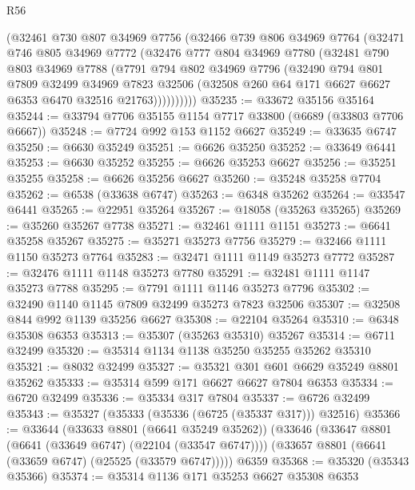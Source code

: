 \begin{lexlean}{R56}
\begin{coremodule}
        (@32461
          @730
          @807
          @34969
          @7756
          (@32466
            @739
            @806
            @34969
            @7764
            (@32471
              @746
              @805
              @34969
              @7772
              (@32476
                @777
                @804
                @34969
                @7780
                (@32481
                  @790
                  @803
                  @34969
                  @7788
                  (@7791
                    @794
                    @802
                    @34969
                    @7796
                    (@32490
                      @794
                      @801
                      @7809
                      @32499
                      @34969
                      @7823
                      @32506
                      (@32508 @260 @64 @171 @6627 @6627 @6353 @6470 @32516 @21763))))))))))
@35235 := @33672 @35156 @35164
@35244 := @33794 @7706 @35155 @1154 @7717 @33800 (@6689 (@33803 @7706 @6667))
@35248 := @7724 @992 @153 @1152 @6627
@35249 := @33635 @6747
@35250 := @6630 @35249
@35251 := @6626 @35250
@35252 := @33649 @6441
@35253 := @6630 @35252
@35255 := @6626 @35253 @6627
@35256 := @35251 @35255
@35258 := @6626 @35256 @6627
@35260 := @35248 @35258 @7704
@35262 := @6538 (@33638 @6747)
@35263 := @6348 @35262
@35264 := @33547 @6441
@35265 := @22951 @35264
@35267 := @18058 (@35263 @35265)
@35269 := @35260 @35267 @7738
@35271 := @32461 @1111 @1151
@35273 := @6641 @35258 @35267
@35275 := @35271 @35273 @7756
@35279 := @32466 @1111 @1150 @35273 @7764
@35283 := @32471 @1111 @1149 @35273 @7772
@35287 := @32476 @1111 @1148 @35273 @7780
@35291 := @32481 @1111 @1147 @35273 @7788
@35295 := @7791 @1111 @1146 @35273 @7796
@35302 := @32490 @1140 @1145 @7809 @32499 @35273 @7823 @32506
@35307 := @32508 @844 @992 @1139 @35256 @6627
@35308 := @22104 @35264
@35310 := @6348 @35308 @6353
@35313 := @35307 (@35263 @35310) @35267
@35314 := @6711 @32499
@35320 := @35314 @1134 @1138 @35250 @35255 @35262 @35310
@35321 := @8032 @32499
@35327 := @35321 @301 @601 @6629 @35249 @8801 @35262
@35333 := @35314 @599 @171 @6627 @6627 @7804 @6353
@35334 := @6720 @32499
@35336 := @35334 @317 @7804
@35337 := @6726 @32499
@35343 := @35327 (@35333 (@35336 (@6725 (@35337 @317))) @32516)
@35366 := @33644
    (@33633 @8801 (@6641 @35249 @35262))
    (@33646
      (@33647 @8801 (@6641 (@33649 @6747) (@22104 (@33547 @6747))))
      (@33657 @8801 (@6641 (@33659 @6747) (@25525 (@33579 @6747)))))
    @6359
@35368 := @35320 (@35343 @35366)
@35374 := @35314 @1136 @171 @35253 @6627 @35308 @6353

\end{coremodule}
\end{lexlean}

